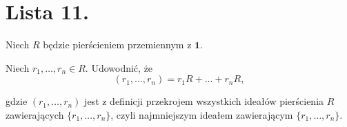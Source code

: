 \chapter{Lista 11.}
\begin{context}

	Niech $R$ będzie pierścieniem przemiennym z $\mathbf{1}$.
\end{context}
\begin{problem}[1]
	Niech $r_1,\ldots,r_{n} \in R.$ Udowodnić, że 
	\[
		\left( r_1,\ldots,r_{n} \right) = r_1R + \ldots + r_{n}R
	,\] 
	
\noindent gdzie $\left( r_1,\ldots,r_{n} \right) $ jest z definicji przekrojem wszystkich ideałów pierścienia $R$ zawierających $\{r_1, \ldots, r_{n}\} $, czyli najmniejszym ideałem zawierającym $\{r_1,\ldots, r_{n}\} $.
\end{problem} 
